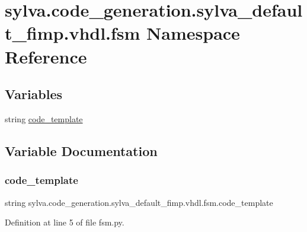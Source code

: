 \hypertarget{namespacesylva_1_1code__generation_1_1sylva__default__fimp_1_1vhdl_1_1fsm}{}\section{sylva.\+code\+\_\+generation.\+sylva\+\_\+default\+\_\+fimp.\+vhdl.\+fsm Namespace Reference}
\label{namespacesylva_1_1code__generation_1_1sylva__default__fimp_1_1vhdl_1_1fsm}
\subsection*{Variables}
\begin{DoxyCompactItemize}
\item 
string \hyperlink{namespacesylva_1_1code__generation_1_1sylva__default__fimp_1_1vhdl_1_1fsm_a75560ab27f571103e8d8a3b24cebddb8}{code\+\_\+template}
\end{DoxyCompactItemize}


\subsection{Variable Documentation}
\mbox{\label{namespacesylva_1_1code__generation_1_1sylva__default__fimp_1_1vhdl_1_1fsm_a75560ab27f571103e8d8a3b24cebddb8}} 
\subsubsection{\texorpdfstring{code\+\_\+template}{code\_template}}
{\footnotesize\ttfamily string sylva.\+code\+\_\+generation.\+sylva\+\_\+default\+\_\+fimp.\+vhdl.\+fsm.\+code\+\_\+template}



Definition at line 5 of file fsm.\+py.

